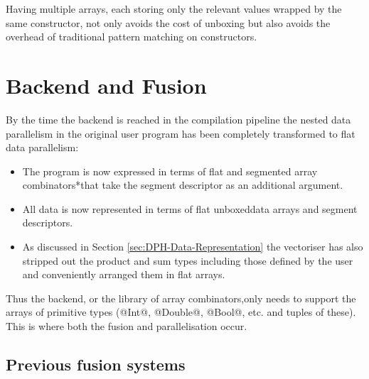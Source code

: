 \documentclass[preamble.tex]{subfiles}
\begin{document}
Having multiple arrays, each storing only the relevant values wrapped by the same constructor, not only avoids the cost of unboxing but also avoids the overhead of traditional pattern matching on constructors.


\clearpage

\section{Backend and Fusion}

By the time the backend is reached in the compilation pipeline the nested data parallelism in the original user program has been completely transformed to flat data parallelism:
\begin{itemize}
\item The program is now expressed in terms of flat and \*segmented array combinators*\isegcomb that take the segment descriptor as an additional argument.
\item All data is now represented in terms of flat unboxed\iboxing data arrays and segment descriptors.\isegd
\item As discussed in Section \ref{sec:DPH-Data-Representation} the vectoriser has also stripped out the product and sum types including those defined by the user and conveniently arranged them in flat arrays.
\end{itemize}

Thus the backend, or the library of array combinators,\icomb only needs to support the arrays of primitive types (@Int@, @Double@, @Bool@, etc. and tuples of these). This is where both the fusion and parallelisation occur.



\subsection{Previous fusion systems}
\label{sec:DPH-fusion-levels}
\end{document}

